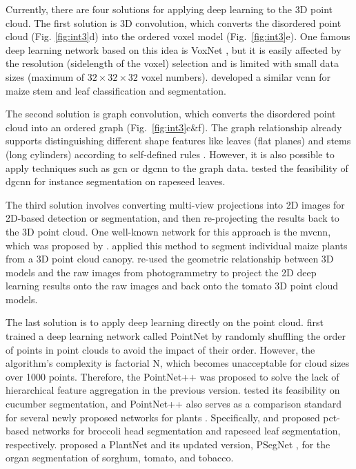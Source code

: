 

Currently, there are four solutions for applying deep learning to the 3D point cloud. The first solution is 3D convolution, which converts the disordered point cloud (Fig. \ref{fig:int3}d) into the ordered voxel model (Fig.~\ref{fig:int3}e). One famous deep learning network based on this idea is VoxNet \citep{Maturana_VoxNet_2015}, but it is easily affected by the resolution (sidelength of the voxel) selection and is limited with small data sizes (maximum of $32 \times 32 \times 32$ voxel numbers). \citet{jin_separating_2020} developed a similar \gls{vcnn} for maize stem and leaf classification and segmentation.

The second solution is graph convolution, which converts the disordered point cloud into an ordered graph (Fig.~\ref{fig:int3}c\&f). The graph relationship already supports distinguishing different shape features like leaves (flat planes) and stems (long cylinders) according to self-defined rules \citep{mirande_graph-based_2022}. However, it is also possible to apply techniques such as \gls{gcn} \citep{wu_comprehensive_2021,zhou_graph_2020} or \gls{dgcnn} \citep{phan_dgcnn_2018} to the graph data. \citet{du_pst_2023} tested the feasibility of \gls{dgcnn} for instance segmentation on rapeseed leaves.

The third solution involves converting multi-view projections into 2D images for 2D-based detection or segmentation, and then re-projecting the results back to the 3D point cloud. One well-known network for this approach is the \gls{mvcnn}, which was proposed by \citet{su_mvcnn_2015}. \citet{jin_deep_2018} applied this method to segment individual maize plants from a 3D point cloud canopy. \citet{van_plant_2019} re-used the geometric relationship between 3D models and the raw images from photogrammetry to project the 2D deep learning results onto the raw images and back onto the tomato 3D point cloud models.

The last solution is to apply deep learning directly on the point cloud.  \citet{qi_pointnet_2016} first trained a deep learning network called PointNet by randomly shuffling the order of points in point clouds to avoid the impact of their order. However, the algorithm's complexity is factorial N, which becomes unacceptable for cloud sizes over 1000 points. Therefore, the PointNet++ \citep{qi_pointnet_2017} was proposed to solve the lack of hierarchical feature aggregation in the previous version. \citet{boogaard_boosting_2021} tested its feasibility on cucumber segmentation, and PointNet++ also serves as a comparison standard for several newly proposed networks for plants \citep{jin_separating_2020,zhou_automated_2022,du_pst_2023,li_psegnet_2022}. Specifically, \citet{zhou_automated_2022} and \citet{du_pst_2023} proposed \gls{pct}-based networks for broccoli head segmentation and rapeseed leaf segmentation, respectively. \citet{li_plantnet_2022} proposed a PlantNet and its updated version, PSegNet \citep{li_psegnet_2022}, for the organ segmentation of sorghum, tomato, and tobacco.

